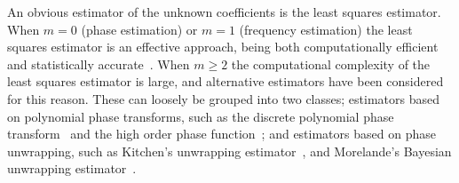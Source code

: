 \documentclass[aap,preprint]{imsart}
\begin{document}
%

An obvious estimator of the unknown coefficients is the least squares estimator.  
When $m=0$ (phase estimation) or $m=1$ (frequency estimation) the least squares estimator is an effective approach, being both computationally efficient and statistically accurate~\cite{Hannan1973,Quinn2001,McKilliam_mean_dir_est_sq_arc_length2010}. When $m \geq 2$ the computational complexity of the least squares estimator is large, and alternative estimators have been considered for this reason. These can loosely be grouped into two classes; estimators based on polynomial phase transforms, such as the discrete polynomial phase transform~\cite{Peleg_DPT_1995} and the high order phase function~\cite{Farquharson_another_poly_est_2005,Porat_asympt_HAF_DPT_1996}; and estimators based on phase unwrapping, such as Kitchen's unwrapping estimator~\cite{Kitchen_polyphase_unwrapping_1994}, and Morelande's Bayesian unwrapping estimator~\cite{Morelande_bayes_unwrapping_2009_tsp}.
\end{document}
